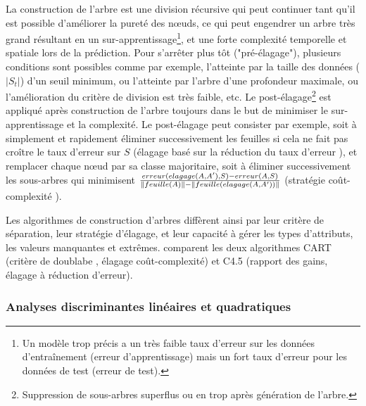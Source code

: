 La construction de l'arbre est une division récursive qui peut continuer tant qu'il est possible d'améliorer la pureté des nœuds, ce qui peut engendrer un arbre très grand résultant en un sur-apprentissage\footnote{Un modèle trop précis a un très faible taux d'erreur sur les données d'entraînement (erreur d'apprentissage) mais un fort taux d'erreur pour les données de test (erreur de test).}, et une forte complexité temporelle et spatiale lors de la prédiction. Pour s'arrêter plus tôt ("pré-élagage"), plusieurs conditions sont possibles comme par exemple, l'atteinte par la taille des données ($\vert S_t \vert$) d'un seuil minimum, ou l'atteinte par l'arbre d'une profondeur maximale, ou l'amélioration du critère de division est très faible, etc. Le post-élagage\footnote{Suppression de sous-arbres superflus ou en trop après génération de l'arbre.} est appliqué après construction de l'arbre toujours dans le but de minimiser le sur-apprentissage et la complexité. Le post-élagage peut consister par exemple, soit à simplement et rapidement éliminer successivement les feuilles si cela  ne fait pas croître le taux d'erreur sur $S$ (\og élagage basé sur la réduction du taux d'erreur \fg{}), et remplacer chaque nœud par sa classe majoritaire, soit à éliminer successivement les sous-arbres qui minimisent $\frac{erreur(elagage(A, A'), S) - erreur(A, S)}{\left\lVert feuille(A)\right\rVert - \left\lVert feuille(elagage(A, A'))\right\rVert}$ (\og stratégie coût-complexité \fg{}). 

Les algorithmes de construction d'arbres diffèrent ainsi par leur critère de séparation, leur stratégie d'élagage, et leur capacité à gérer les types d'attributs, les valeurs manquantes et extrêmes. \citet{singh2014id3cartc45} comparent les deux algorithmes CART (critère de \og doublabe \fg{}, élagage coût-complexité) et C4.5 (rapport des gains, élagage à réduction d'erreur).

\subsubsection{Analyses discriminantes linéaires et quadratiques}


